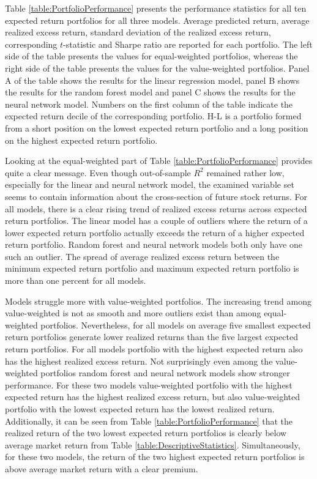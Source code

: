 \documentclass[12pt]{article}
\begin{document}
Table \ref{table:PortfolioPerformance} presents the performance statistics for all ten expected return portfolios for all three models. Average predicted return, average realized excess return, standard deviation of the realized excess return, corresponding $t$-statistic and Sharpe ratio are reported for each portfolio. The left side of the table presents the values for equal-weighted portfolios, whereas the right side of the table presents the values for the value-weighted portfolios. Panel A of the table shows the results for the linear regression model, panel B shows the results for the random forest model and panel C shows the results for the neural network model. Numbers on the first column of the table indicate the expected return decile of the corresponding portfolio. H-L is a portfolio formed from a short position on the lowest expected return portfolio and a long position on the highest expected return portfolio. \par

Looking at the equal-weighted part of Table \ref{table:PortfolioPerformance} provides quite a clear message. Even though out-of-sample $R^2$ remained rather low, especially for the linear and neural network model, the examined variable set seems to contain information about the cross-section of future stock returns. For all models, there is a clear rising trend of realized excess returns across expected return portfolios. The linear model has a couple of outliers where the return of a lower expected return portfolio actually exceeds the return of a higher expected return portfolio. Random forest and neural network models both only have one such an outlier. The spread of average realized excess return between the minimum expected return portfolio and maximum expected return portfolio is more than one percent for all models.  \par

Models struggle more with value-weighted portfolios. The increasing trend among value-weighted is not as smooth and more outliers exist than among equal-weighted portfolios. Nevertheless, for all models on average five smallest expected return portfolios generate lower realized returns than the five largest expected return portfolios. For all models portfolio with the highest expected return also has the highest realized excess return. Not surprisingly even among the value-weighted portfolios random forest and neural network models show stronger performance. For these two models value-weighted portfolio with the highest expected return has the highest realized excess return, but also value-weighted portfolio with the lowest expected return has the lowest realized return. Additionally, it can be seen from Table \ref{table:PortfolioPerformance} that the realized return of the two lowest expected return portfolios is clearly below average market return from Table \ref{table:DescriptiveStatistics}. Simultaneously, for these two models, the return of the two highest expected return portfolios is above average market return with a clear premium. \par
\end{document}
